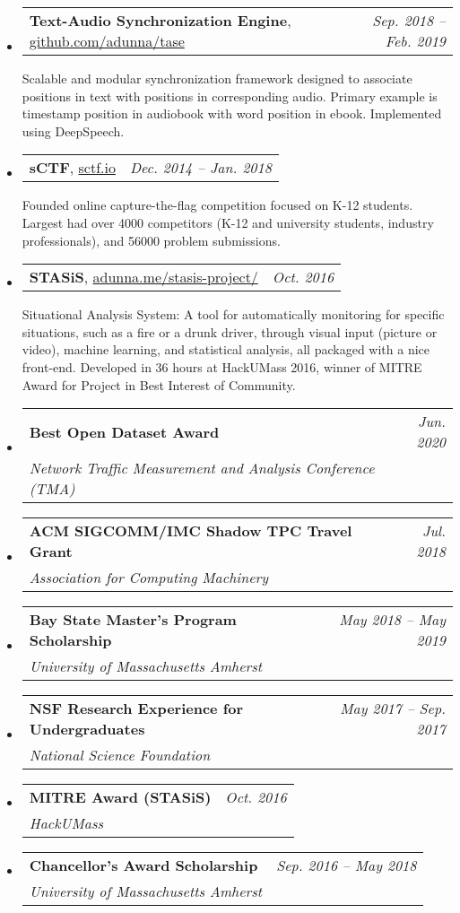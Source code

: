\documentclass[letterpaper,11pt]{article}
\makeatletter
\newlength{\outerbordwidth}
\newcommand{\resheading}[1]{\vspace{8pt}
  \parbox{\textwidth}{\setlength{\FrameSep}{\outerbordwidth}
    \begin{shaded}
\setlength{\fboxsep}{0pt}{\setlength{\fboxsep}{4pt}\fcolorbox{shadecolorB}{shadecolorB}{\textbf{\mbox{~}\makebox[6.762in][l]{\Large #1} \vphantom{p\^{E}}}}}
    \end{shaded}
  }\vspace{-5pt}
}
\newcommand{\ressubheadingNONIT}[4]{
\begin{tabular*}{6.5in}{l@{\cftdotfill{\cftsecdotsep}\extracolsep{\fill}}r}
		\textbf{#1}, #2 & \textit{#4} \\
\end{tabular*}\vspace{2mm}\newline#3\vspace{1mm}}
\newcommand{\ressubheadingNONITtwo}[4]{
\begin{tabular*}{6.5in}{l@{\cftdotfill{\cftsecdotsep}\extracolsep{\fill}}r}
		\textbf{#1} & \textit{#4} \\
    \textit{#2} & \\
\end{tabular*}\vspace{-6pt}}
\makeatother
\begin{document}
\begin{itemize}
\item
\ressubheadingNONIT{Text-Audio Synchronization Engine}{\href{https://github.com/adunna/tase}{github.com/adunna/tase}}{Scalable and modular synchronization framework designed to associate positions in text with positions in corresponding audio. Primary example is timestamp position in audiobook with word position in ebook. Implemented using DeepSpeech.}{Sep. 2018 -- Feb. 2019}
\item
\ressubheadingNONIT{sCTF}{\href{https://sctf.io}{sctf.io}}{Founded online capture-the-flag competition focused on K-12 students. Largest had over 4000 competitors (K-12 and university students, industry professionals), and 56000 problem submissions.}{Dec. 2014 -- Jan. 2018}
\item
\ressubheadingNONIT{STASiS}{\href{https://adunna.me/stasis-project/}{adunna.me/stasis-project/}}{Situational Analysis System: A tool for automatically monitoring for specific situations, such as a fire or a drunk driver, through visual input (picture or video), machine learning, and statistical analysis, all packaged with a nice front-end. Developed in 36 hours at HackUMass 2016, winner of MITRE Award for Project in Best Interest of Community.}{Oct. 2016}
\end{itemize}

\resheading{Awards}

\begin{itemize}
\item
\ressubheadingNONITtwo{Best Open Dataset Award}{Network Traffic Measurement and Analysis Conference (TMA)}{}{Jun. 2020}
\item
\ressubheadingNONITtwo{ACM SIGCOMM/IMC Shadow TPC Travel Grant}{Association for Computing Machinery}{}{Jul. 2018}
\item
\ressubheadingNONITtwo{Bay State Master's Program Scholarship}{University of Massachusetts Amherst}{}{May 2018 -- May 2019}
\item
\ressubheadingNONITtwo{NSF Research Experience for Undergraduates}{National Science Foundation}{}{May 2017 -- Sep. 2017}
\item
\ressubheadingNONITtwo{MITRE Award (STASiS)}{HackUMass}{}{Oct. 2016}
\item
\ressubheadingNONITtwo{Chancellor's Award Scholarship}{University of Massachusetts Amherst}{}{Sep. 2016 -- May 2018}
\end{itemize}
\end{document}

